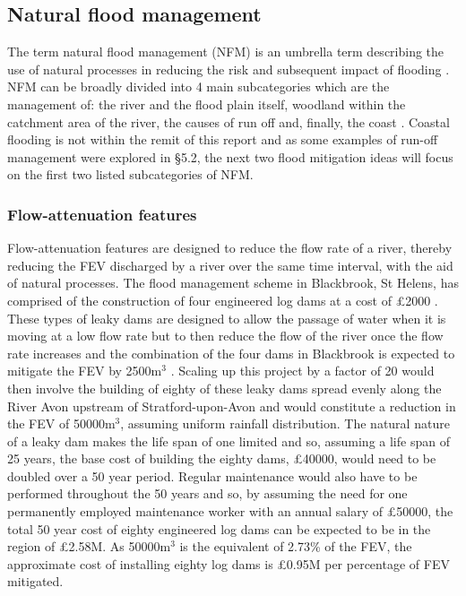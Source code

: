 \documentclass[11pt,a4paper]{article}
\begin{document}
\subsection{Natural flood management}
The term natural flood management (NFM) is an umbrella term describing the use of natural processes in reducing the risk and subsequent impact of flooding \cite{NFM}. NFM can be broadly divided into 4 main subcategories which are the management of: the river and the flood plain itself, woodland within the catchment area of the river, the causes of run off and, finally, the coast \cite{nfm}. Coastal flooding is not within the remit of this report and as some examples of run-off management were explored in \S 5.2, the next two flood mitigation ideas will focus on the first two listed subcategories of NFM.

\subsubsection{Flow-attenuation features}
Flow-attenuation features are designed to reduce the flow rate of a river, thereby reducing the FEV discharged by a river over the same time interval, with the aid of natural processes. The flood management scheme in Blackbrook, St Helens, has comprised of the construction of four engineered log dams at a cost of \pounds2000 \cite{nfm}. These types of leaky dams are designed to allow the passage of water when it is moving at a low flow rate but to then reduce the flow of the river once the flow rate increases and the combination of the four dams in Blackbrook is expected to mitigate the FEV by 2500m$^3$ \cite{blackbrook}. Scaling up this project by a factor of 20 would then involve the building of eighty of these leaky dams spread evenly along the River Avon upstream of Stratford-upon-Avon and would constitute a reduction in the FEV of 50000m$^3$, assuming uniform rainfall distribution. The natural nature of a leaky dam makes the life span of one limited and so, assuming a life span of 25 years, the base cost of building the eighty dams, \pounds40000, would need to be doubled over a 50 year period. Regular maintenance would also have to be performed throughout the 50 years and so, by assuming the need for one permanently employed maintenance worker with an annual salary of \pounds50000, the total 50 year cost of eighty engineered log dams can be expected to be in the region of \pounds2.58M. As 50000m$^3$ is the equivalent of 2.73\% of the FEV, the approximate cost of installing eighty log dams is \pounds0.95M per percentage of FEV mitigated.
\end{document}
